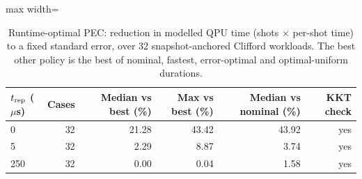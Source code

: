 \begin{table}[t]
\centering
\caption{Runtime-optimal PEC: reduction in modelled QPU time (shots $\times$ per-shot time) to a fixed standard error, over 32 snapshot-anchored Clifford workloads. The best other policy is the best of nominal, fastest, error-optimal and optimal-uniform durations.}\label{tab:c3}
\footnotesize
\begin{adjustbox}{max width=\columnwidth}
\begin{tabular}{lrrrrr}
\toprule
$t_{\rm rep}$ ($\mu$s) & Cases & Median vs best (\%) & Max vs best (\%) & Median vs nominal (\%) & KKT check \\
\midrule
0 & 32 & 21.28 & 43.42 & 43.92 & yes \\
5 & 32 & 2.29 & 8.87 & 3.74 & yes \\
250 & 32 & 0.00 & 0.04 & 1.58 & yes \\
\bottomrule
\end{tabular}
\end{adjustbox}
\end{table}

